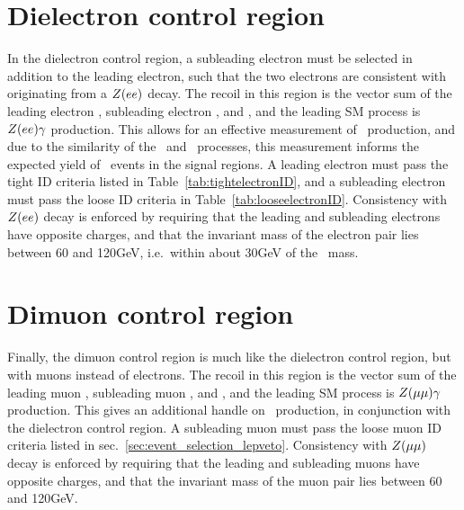 \section{Dielectron control region} \label{sec:event_selection_diele}
In the dielectron control region, a subleading electron must be selected in addition to the leading electron, such that the two electrons
are consistent with originating from a $Z(ee)$ decay.
The recoil in this region is the vector sum of the leading electron \pT, subleading electron \pT, and \vecMET, and the leading SM process
is $Z(ee)\gamma$ production. This allows for an effective measurement of \zllg\ production, and due to the similarity of the \zinvg\ and \zllg\ processes,
this measurement informs the expected yield of \zinvg\ events in the signal regions.
A leading electron must pass the tight ID criteria listed in Table~\ref{tab:tightelectronID},
and a subleading electron must pass the loose ID criteria in Table~\ref{tab:looseelectronID}.
Consistency with $Z(ee)$ decay is enforced by requiring that the leading and subleading electrons have opposite charges, and that the invariant mass of the
electron pair lies between 60 and 120\unit{GeV}, i.e.\ within about 30\unit{GeV} of the \PZ\ mass.

\section{Dimuon control region} \label{sec:event_selection_dimu}
Finally, the dimuon control region is much like the dielectron control region, but with muons instead of electrons.
The recoil in this region is the vector sum of the leading muon \pT, subleading muon \pT, and \vecMET, and the leading SM process
is $Z(\mu\mu)\gamma$ production. This gives an additional handle on \zinvg\ production, in conjunction with the dielectron control region.
A subleading muon must pass the loose muon ID criteria listed in sec.~\ref{sec:event_selection_lepveto}.
Consistency with $Z(\mu\mu)$ decay is enforced by requiring that the leading and subleading muons have opposite charges, and that the invariant mass of the
muon pair lies between 60 and 120\unit{GeV}.
